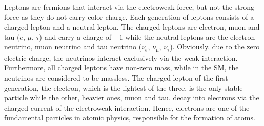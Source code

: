 \indent Leptons are fermions that interact via the electroweak force, but not the strong force as they do not carry color charge. Each generation of leptons consists of a charged lepton and a neutral lepton. The charged leptons are electron, muon and tau ($e$, $\mu$, $\tau$) and carry a charge of $-1$ while the neutral leptons are the electron neutrino, muon neutrino and tau neutrino ($\nu_e$, $\nu_\mu$, $\nu_\tau$). Obviously, due to the zero electric charge, the neutrinos interact exclusively via the weak interaction. Furthermore, all charged leptons have non-zero mass, while in the SM, the neutrinos are considered to be massless. The charged lepton of the first generation, the electron, which is the lightest of the three, is the only stable particle while the other, heavier ones, muon and tau, decay into electrons via the charged current of the electroweak interaction. Hence, electrons are one of the fundamental particles in atomic physics, responsible for the formation of atoms.
